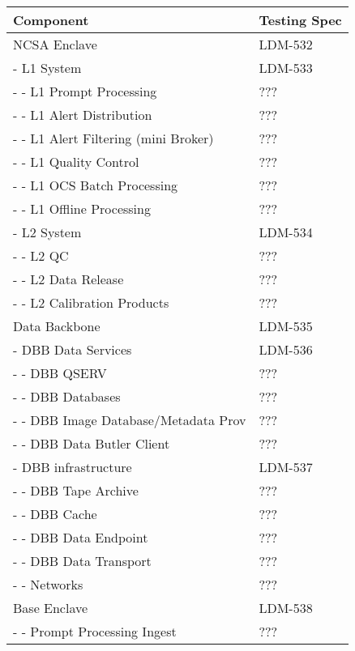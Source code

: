 \begin{longtable}{|p{}|p{}|}\hline 
 \bf Component & Testing Spec \\ \hline   
\rowcolor{orange} 
 NCSA Enclave &  LDM-532 \\ \hline 
\rowcolor{yellow} 
 - L1 System &  LDM-533 \\ \hline 
- - L1 Prompt Processing &  ??? \\ \hline 
- - L1 Alert Distribution &  ??? \\ \hline 
- - L1 Alert Filtering (mini Broker) &  ??? \\ \hline 
- - L1 Quality Control &  ??? \\ \hline 
- - L1 OCS Batch Processing &  ??? \\ \hline 
- - L1 Offline Processing &  ??? \\ \hline 
\rowcolor{yellow} 
 - L2 System &  LDM-534 \\ \hline 
- - L2 QC &  ??? \\ \hline 
- - L2 Data Release &  ??? \\ \hline 
- - L2 Calibration Products &  ??? \\ \hline 
\rowcolor{orange} 
 Data Backbone &  LDM-535 \\ \hline 
\rowcolor{yellow} 
 - DBB Data Services &  LDM-536 \\ \hline 
- - DBB QSERV &  ??? \\ \hline 
- - DBB Databases &  ??? \\ \hline 
- - DBB Image Database/Metadata Prov &  ??? \\ \hline 
- - DBB Data Butler Client &  ??? \\ \hline 
\rowcolor{yellow} 
 - DBB infrastructure &  LDM-537 \\ \hline 
- - DBB Tape Archive &  ??? \\ \hline 
- - DBB Cache &  ??? \\ \hline 
- - DBB Data Endpoint &  ??? \\ \hline 
- - DBB Data Transport &  ??? \\ \hline 
- - Networks  &  ??? \\ \hline 
\rowcolor{orange} 
 Base Enclave &  LDM-538 \\ \hline 
- - Prompt Processing Ingest  &  ??? \\ \hline 

\end{longtable}
